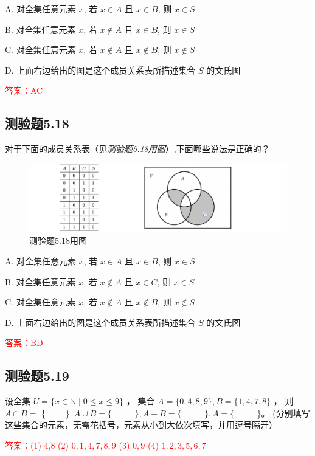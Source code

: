 \documentclass[UTF8, heading=true]{ctexart}
\begin{document}
A. 对全集任意元素 $x$, 若 $x \in A$ 且 $x \in B$, 则 $x \in S$

B. 对全集任意元素 $x$, 若 $x \notin A$ 且 $x \in B$, 则 $x \in S$

C. 对全集任意元素 $x$, 若 $x \notin A$ 且 $x \notin B$, 则 $x \notin S$

D. 上面右边给出的图是这个成员关系表所描述集合 $S$ 的文氏图

\textcolor{red}{答案：AC}


\subsection{测验题5.18}
对于下面的成员关系表（见\textit{测验题5.18用图}）,下面哪些说法是正确的？

\begin{figure}[H]
  \centering
  \includegraphics[width=1\textwidth]{5.18.jpg} %
  \caption{测验题5.18用图}
\end{figure}

A. 对全集任意元素 $x$, 若 $x \in A$ 且 $x \in B$, 则 $x \in S$

B. 对全集任意元素 $x$, 若 $x \notin A$ 且 $x \in C$, 则 $x \in S$

C. 对全集任意元素 $x$, 若 $x \notin A$ 且 $x \notin B$, 则 $x \notin S$

D. 上面右边给出的图是这个成员关系表所描述集合 $S$ 的文氏图



\textcolor{red}{答案：BD}

\subsection{测验题5.19}

设全集 $U=\{x \in \mathbb{N} \mid 0 \leq x \leq 9\}$ ，
集合 $A=\{0,4,8,9\}, B=\{1,4,7,8\}$ ，
则 $A \cap B=$ \{ $\qquad $\} $ \, A \cup B=\{$ $\qquad$ $\}, A-B=\{$ $\qquad$ $\}, \bar{A}=\{$ $\qquad$ \}。 (分别填写这些集合的元素，无需花括号，元素从小到大依次填写，并用逗号隔开）


\textcolor{red}{答案：(1) 4,8
(2) $0,1,4,7,8,9$
(3) $0,9$
(4) $1,2,3,5,6,7$}
\end{document}
